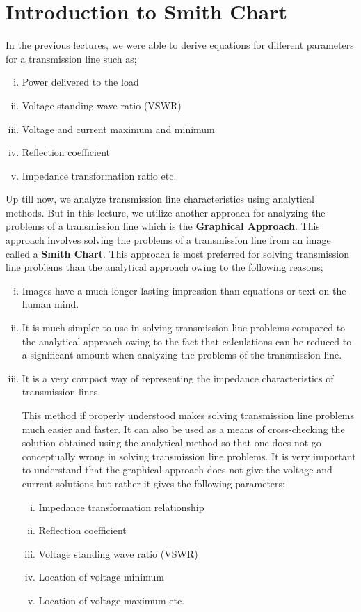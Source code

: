 \chapter{Introduction to Smith Chart}\label{lec:lec7}
In the previous lectures, we were able to derive equations for different parameters for a transmission line such as;
\begin{enumerate}[(i)]
\item 	Power delivered to the load
\item	Voltage standing wave ratio (VSWR)
\item	Voltage and current maximum and minimum
\item	Reflection coefficient
\item	Impedance transformation ratio etc.
\end{enumerate}

Up till now, we analyze transmission line characteristics using analytical methods. But in this lecture, we utilize another approach for analyzing the problems of a transmission line which is the \textbf{Graphical Approach}.
This approach involves solving the problems of a transmission line from an image called a \textbf{Smith Chart}.
This approach is most preferred for solving transmission line problems than the analytical approach owing to the following reasons;\\
\begin{enumerate}[(i)]
\item Images have a much longer-lasting impression than equations or text on the human mind.
\item	It is much simpler to use in solving transmission line problems compared to the analytical approach owing to the fact that calculations can be reduced to a significant amount when analyzing the problems of the transmission line.
\item	It is a very compact way of representing the impedance characteristics of transmission lines.

This method if properly understood makes solving transmission line problems much easier and faster.  It can also be used as a means of cross-checking the solution obtained using the analytical method so that one does not go conceptually wrong in solving transmission line problems.
It is very important to understand that the graphical approach does not give the voltage and current solutions but rather it gives the following parameters:
\begin{enumerate}[(i)]
\item	Impedance transformation relationship 
\item Reflection coefficient
\item Voltage standing wave ratio (VSWR)
\item Location of voltage minimum
\item	Location of voltage maximum etc.
\end{enumerate}
\end{enumerate}

